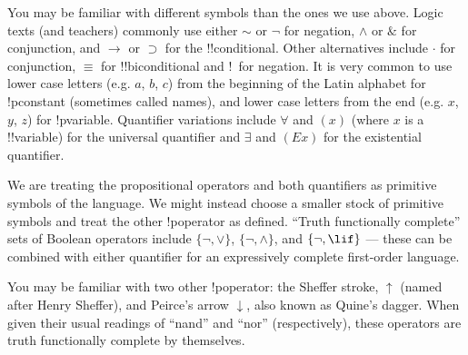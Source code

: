 \documentclass[../../include/open-logic-section]{subfiles}
\begin{document}

\begin{intro}
You may be familiar with different symbols than the ones we use
above. Logic texts (and teachers) commonly use either $\sim$ or $\neg$
for negation, $\wedge$ or $\&$ for conjunction, and $\rightarrow$ or
$\supset$ for the !!{conditional}. Other alternatives include $\cdot$ for
conjunction, $\equiv$ for !!{biconditional} and !~for negation. It is very
common to use lower case letters (e.g. $a$, $b$, $c$) from the
beginning of the Latin alphabet for !p{constant} (sometimes called
names), and lower case letters from the end (e.g. $x$, $y$, $z$)
for !p{variable}. Quantifier variations include $\forall$ and $(x)$
(where $x$ is a !!{variable}) for the universal quantifier and
$\exists$ and $(Ex)$ for the existential quantifier.
\end{intro}


\begin{explain}
We are treating the propositional operators and both quantifiers as
primitive symbols of the language. We might instead choose a smaller
stock of primitive symbols and treat the other !p{operator} as
defined. ``Truth functionally complete'' sets of Boolean operators
include $\{ \lnot, \lor \}$, $\{ \lnot, \land \}$, and $\{ \lnot,
\lif\}$ --- these can be combined with either quantifier for an
expressively complete first-order language.

You may be familiar with two other !p{operator}: the Sheffer
stroke, $\uparrow$ (named after Henry Sheffer), and Peirce's arrow
$\downarrow$, also known as Quine's dagger. When given their usual
readings of ``nand'' and ``nor'' (respectively), these operators are
truth functionally complete by themselves.
\end{explain}
\end{document}
